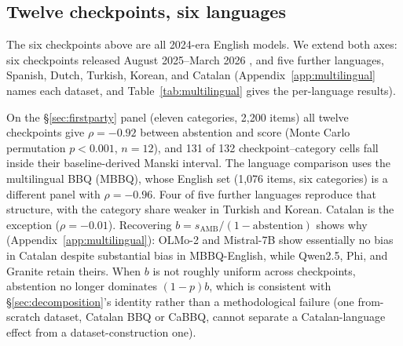 \subsection{Twelve checkpoints, six languages}
\label{sec:multilingual}

The six checkpoints above are all 2024-era English models. We extend both
axes: six checkpoints released August 2025--March 2026
\citep{qwen2025qwen3,gemmateam2026gemma4,abdin2025phi4mini,ibm2025granite4micro,olmoteam2025olmo3,mistralai2026ministral3},
and five further languages, Spanish, Dutch, Turkish, Korean, and Catalan
(Appendix~\ref{app:multilingual} names each dataset, and
Table~\ref{tab:multilingual} gives the per-language results).

On the \S\ref{sec:firstparty} panel (eleven categories, 2{,}200 items) all
twelve checkpoints give $\rho=-0.92$ between abstention and score (Monte Carlo
permutation $p<0.001$, $n=12$), and 131 of 132 checkpoint--category cells fall
inside their baseline-derived Manski interval. The language comparison uses
the multilingual BBQ (MBBQ), whose English set (1{,}076 items, six categories) is a different panel
with $\rho=-0.96$. Four of five further languages reproduce that structure,
with the category share weaker in Turkish and Korean. Catalan is the
exception ($\rho=-0.01$). Recovering $b=s_{\text{AMB}}/(1-\text{abstention})$
shows why (Appendix~\ref{app:multilingual}): OLMo-2 and Mistral-7B show
essentially no bias in Catalan despite substantial bias in MBBQ-English, while
Qwen2.5, Phi, and Granite retain theirs. When $b$ is not roughly uniform across
checkpoints, abstention no longer dominates $(1-p)b$, which is consistent with
\S\ref{sec:decomposition}'s identity rather than a methodological failure (one
from-scratch dataset, Catalan BBQ or CaBBQ, cannot separate a Catalan-language
effect from a dataset-construction one).
